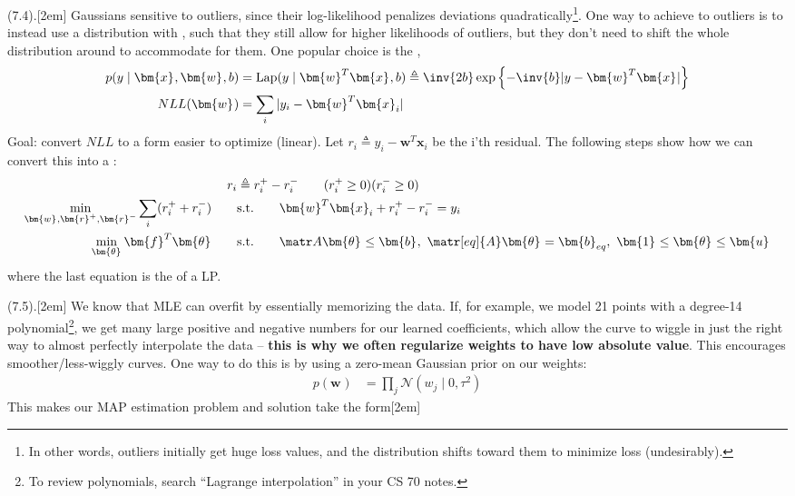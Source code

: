 \documentclass[11pt]{article}
\renewcommand\vec[2][]{\bm{#2}_{#1}}
\newcommand\myspace[1][]{\vspace{#1\bigskipamount}}
\newcommand\p{\Needspace{10\baselineskip} \noindent}
\begin{document}
\myspace
\p {} (7.4).[2em] Gaussians sensitive to outliers, since their log-likelihood penalizes deviations quadratically\footnote{In other words, outliers initially get huge loss values, and the distribution shifts toward them to minimize loss (undesirably).}. One way to achieve  to outliers is to instead use a distribution with , such that they still allow for higher likelihoods of outliers, but they don't need to shift the whole distribution around to accommodate for them. One popular choice is the ,
\begin{align}
	p(y \mid \vec x , \vec w, b)
		&= \text{Lap}(y \mid \vec{w}^T \vec x, b)
		\triangleq \inv{2b} \exp\left\{ - \inv{b} | y - \vec{w}^T\vec x  | \right\} \\
	NLL(\vec w)
		&= \sum_i | y_i - \vec{w}^T \vec[i]{x} |
\end{align}
Goal: convert $NLL$ to a form easier to optimize (linear). Let $r_i \triangleq y_i - \vec{w}^T \vec[i]{x}$ be the i'th residual. The following steps show how we can convert this into a :
\begin{align}
	r_i
		&\triangleq r_i^+ - r_i^- \qquad (r_i^+ \ge 0)(r_i^- \ge 0)     \\
	\min_{\vec w, \vec{r}^+, \vec{r}^-} \sum_i (r_i^+ + r_i^-)
	\qquad&\text{s.t.}\qquad \vec{w}^T\vec[i]{x} + r_i^+ - r_i^- = y_i \\
	\min_{\vec\theta} \vec{f}^T \vec{\theta}
	\qquad&\text{s.t.}\qquad \matr A \vec{\theta} \le \vec b, ~ \matr[eq]{A}\vec{\theta} = \vec[eq]{b}, ~ \vec 1 \le \vec\theta \le \vec u
\end{align}
where the last equation is the  of a LP. 

\myspace 
\p {} (7.5).[2em] We know that MLE can overfit by essentially memorizing the data. If, for example, we model 21 points with a degree-14 polynomial\footnote{To review polynomials, search ``Lagrange interpolation'' in your CS 70 notes.}, we get many large positive and negative numbers for our learned coefficients, which allow the curve to wiggle in just the right way to almost perfectly interpolate the data -- \textbf{this is why we often regularize weights to have low absolute value}. This encourages smoother/less-wiggly curves. One way to do this is by using a zero-mean Gaussian prior on our weights:
\begin{align}
	p(\vec w)
		&= \prod_j \mathcal{N}(w_j \mid 0, \tau^2)
\end{align}
This makes our MAP estimation problem and solution take the form[2em]
\graybox{
	J(\vec w) 
		&= \inv{N} \sum_i^N \left(  y_i - \vec{w}^T \vec[i]{x} - w_0  \right) + \lambda ||\vec w||_2^2 \\
	\vec[ridge]{\hat w}
		&= ( \matr{X}^T \matr X + \lambda \matr[D]{I}  )^{-1} \matr{X}^T \vec y
}
\end{document}
